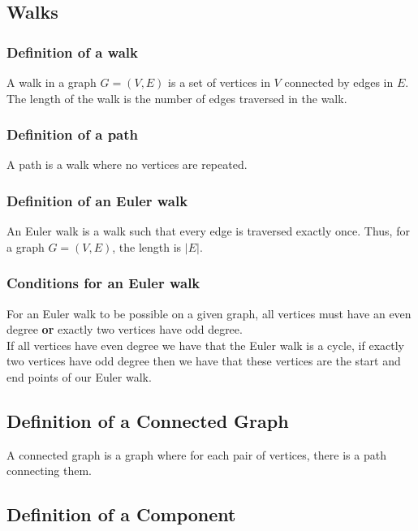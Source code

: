 \documentclass[a4paper, 12pt, twoside]{article}
\begin{document}
\subsection{Walks}

\subsubsection{Definition of a walk}

A walk in a graph $G = (V, E)$ is a set of vertices in $V$ connected
by edges in $E$. The length of the walk is the number of edges
traversed in the walk.

\subsubsection{Definition of a path}

A path is a walk where no vertices are repeated.

\subsubsection{Definition of an Euler walk}

An Euler walk is a walk such that every edge is traversed exactly
once. Thus, for a graph $G = (V, E)$, the length is $|E|$.

\subsubsection{Conditions for an Euler walk}

For an Euler walk to be possible on a given graph,
all vertices must have an even degree \textbf{or} exactly
two vertices have odd degree. 
\\[\baselineskip]
If all vertices have even degree we 
have that the Euler walk is a cycle, if exactly two vertices have
odd degree then we have that these vertices are the start and end
points of our Euler walk. 

\subsection{Definition of a Connected Graph}

A connected graph is a graph where for each pair of vertices,
there is a path connecting them.

\subsection{Definition of a Component}
\end{document}

